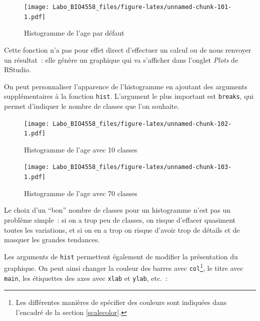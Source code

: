 \documentclass[12pt,]{book}
\newenvironment{Shaded}{\begin{snugshade}}{\end{snugshade}}
\newcommand{\DataTypeTok}[1]{\textcolor[rgb]{0.27,0.27,0.27}{#1}}
\newcommand{\DecValTok}[1]{\textcolor[rgb]{0.06,0.06,0.06}{#1}}
\newcommand{\KeywordTok}[1]{\textcolor[rgb]{0.27,0.27,0.27}{\textbf{#1}}}
\newcommand{\NormalTok}[1]{#1}
\newcommand{\OperatorTok}[1]{\textcolor[rgb]{0.43,0.43,0.43}{\textbf{#1}}}
\newcommand{\StringTok}[1]{\textcolor[rgb]{0.5,0.5,0.5}{#1}}
\begin{document}
\begin{figure}
\centering
\texttt{[image: Labo\_BIO4558\_files/figure-latex/unnamed-chunk-101-1.pdf]}
\caption{\label{fig:unnamed-chunk-101}Histogramme de l'age par défaut}
\end{figure}

Cette fonction n'a pas pour effet direct d'effectuer un calcul ou de nous renvoyer un résultat~: elle génère un graphique qui va s'afficher dans l'onglet \emph{Plots} de RStudio.

On peut personnaliser l'apparence de l'histogramme en ajoutant des arguments supplémentaires à la fonction \texttt{hist}. L'argument le plus important est \texttt{breaks}, qui permet d'indiquer le nombre de classes que l'on souhaite.

\begin{Shaded}
\end{Shaded}

\begin{figure}
\centering
\texttt{[image: Labo\_BIO4558\_files/figure-latex/unnamed-chunk-102-1.pdf]}
\caption{\label{fig:unnamed-chunk-102}Histogramme de l'age avec 10 classes}
\end{figure}

\begin{Shaded}
\end{Shaded}

\begin{figure}
\centering
\texttt{[image: Labo\_BIO4558\_files/figure-latex/unnamed-chunk-103-1.pdf]}
\caption{\label{fig:unnamed-chunk-103}Histogramme de l'age avec 70 classes}
\end{figure}

Le choix d'un ``bon'' nombre de classes pour un histogramme n'est pas un problème simple~: si on a trop peu de classes, on risque d'effacer quasiment toutes les variations, et si on en a trop on risque d'avoir trop de détails et de masquer les grandes tendances.

Les arguments de \texttt{hist} permettent également de modifier la présentation du graphique. On peut ainsi changer la couleur des barres avec \texttt{col}\footnote{Les différentes manières de spécifier des couleurs sont indiquées dans l'encadré de la section \ref{scalecolor}.}, le titre avec \texttt{main}, les étiquettes des axes avec \texttt{xlab} et \texttt{ylab}, etc.~:
\end{document}
